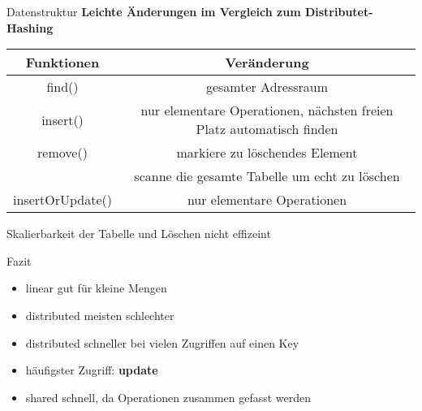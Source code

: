 \documentclass[aspectratio=169]{beamer}
\begin{document}
\begin{frame}{Datenstruktur}
	\center
	\textbf{ Leichte Änderungen im Vergleich zum Distributet-Hashing }
	\vfill
	\pause
   	\begin{tabular}[h]{ c|c}
		\hline
		Funktionen				& Veränderung   \\
		\hline
		\pause
		find()      				& gesamter Adressraum\\
		\hline
		\pause
		insert()				& nur elementare Operationen, nächsten freien Platz automatisch finden \\
		\hline
		\pause
		remove()				& markiere zu löschendes Element  \\
							& scanne die gesamte Tabelle um echt zu löschen \\
		\hline
		\pause
		insertOrUpdate()			& nur elementare Operationen\\
		\hline
		
	\end{tabular}
	\vfill
	\pause
	Skalierbarkeit der Tabelle und Löschen nicht effizeint\\
\end{frame}


\begin{frame}{Fazit}

\begin{itemize}
	\item linear gut für kleine Mengen
	\pause
	\item distributed meisten schlechter
	\pause
	\item distributed schneller bei vielen Zugriffen auf einen Key
	\pause
	\item häufigster Zugriff:\textbf{ update}
	\pause
	\item shared schnell, da Operationen zusammen gefasst werden
\end{itemize}
	
	
\end{frame}
\end{document}
